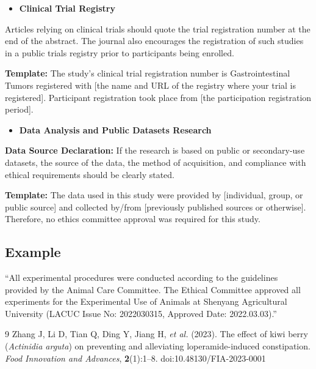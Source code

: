 \documentclass[12pt,a4paper]{article}
\begin{document}
\begin{itemize}
    \item \textbf{Clinical Trial Registry}
\end{itemize}

Articles relying on clinical trials should quote the trial registration number at the end of the abstract. The journal also encourages the registration of such studies in a public trials registry prior to participants being enrolled.

\textbf{Template:} The study’s clinical trial registration number is Gastrointestinal Tumors registered with [the name and URL of the registry where your trial is registered]. Participant registration took place from [the participation registration period].

\begin{itemize}
    \item \textbf{Data Analysis and Public Datasets Research}
\end{itemize}

\textbf{Data Source Declaration:} If the research is based on public or secondary-use datasets, the source of the data, the method of acquisition, and compliance with ethical requirements should be clearly stated.

\textbf{Template:} The data used in this study were provided by [individual, group, or public source] and collected by/from [previously published sources or otherwise]. Therefore, no ethics committee approval was required for this study.

\subsection*{Example}

``All experimental procedures were conducted according to the guidelines provided by the Animal Care Committee. The Ethical Committee approved all experiments for the Experimental Use of Animals at Shenyang Agricultural University (LACUC Issue No: 2022030315, Approved Date: 2022.03.03).''~\cite{zhang2023}

\begin{thebibliography}{9}
 Zhang J, Li D, Tian Q, Ding Y, Jiang H, \textit{et al.} (2023). The effect of kiwi berry (\textit{Actinidia arguta}) on preventing and alleviating loperamide-induced constipation. \textit{Food Innovation and Advances}, \textbf{2}(1):1–8. doi:10.48130/FIA-2023-0001
\end{thebibliography}
\end{document}
